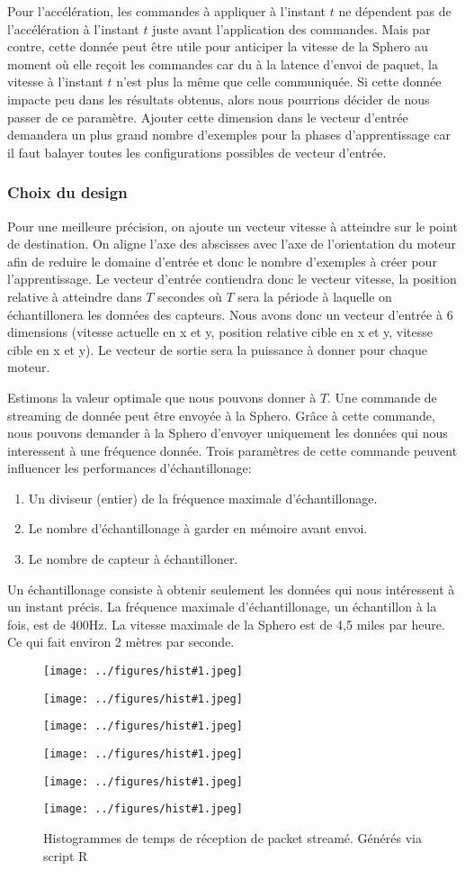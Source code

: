 Pour l'accélération, les commandes à appliquer à l'instant $t$ ne dépendent pas de l'accélération à l'instant $t$ juste avant l'application des commandes.
Mais par contre, cette donnée peut être utile pour anticiper la vitesse de la Sphero au moment où elle reçoit les commandes car du à la latence d'envoi de paquet, la vitesse à l'instant $t$ n'est plus la même que celle communiquée.
Si cette donnée impacte peu dans les résultats obtenus, alors nous pourrions décider de nous passer de ce paramètre.
Ajouter cette dimension dans le vecteur d'entrée demandera un plus grand nombre d'exemples pour la phases d'apprentissage car il faut balayer toutes les configurations possibles de vecteur d'entrée.

\newcommand{\inchist}[1]{
 \begin{minipage}{0.48\textwidth}
  \texttt{[image: ../figures/hist\#1.jpeg]}
 \end{minipage}
}
\subsubsection{Choix du design}\label{sec:choixdesign}
Pour une meilleure précision, on ajoute un vecteur vitesse à atteindre sur le point de destination.
On aligne l'axe des abscisses avec l'axe de l'orientation du moteur afin de reduire le domaine d'entrée et donc le nombre d'exemples à créer pour l'apprentissage.
Le vecteur d'entrée contiendra donc le vecteur vitesse, la position relative à atteindre dans $T$ secondes où $T$ sera la période à laquelle on échantillonera les données des capteurs.
Nous avons donc un vecteur d'entrée à 6 dimensions (vitesse actuelle en x et y, position relative cible en x et y, vitesse cible en x et y).
Le vecteur de sortie sera la puissance à donner pour chaque moteur.

Estimons la valeur optimale que nous pouvons donner à $T$.
Une commande de streaming de donnée peut être envoyée à la Sphero.
Grâce à cette commande, nous pouvons demander à la Sphero d'envoyer uniquement les données qui nous interessent à une fréquence donnée.
Trois paramètres de cette commande peuvent influencer les performances d'échantillonage:
\begin{enumerate}
 \item Un diviseur (entier) de la fréquence maximale d'échantillonage.
 \item Le nombre d'échantillonage à garder en mémoire avant envoi.
 \item Le nombre de capteur à échantilloner.
\end{enumerate}
Un échantillonage consiste à obtenir seulement les données qui nous intéressent à un instant précis.
La fréquence maximale d'échantillonage, un échantillon à la fois, est de 400Hz.\cite{SDKofficiels}
La vitesse maximale de la Sphero est de 4,5 miles par heure.\cite{product} Ce qui fait environ 2 mètres par seconde.
\begin{figure}
 \centering
 \inchist{20}
 \inchist{40}
 \inchist{60}
 \inchist{80}
 \inchist{100}
 \inchist{200}
 \caption{Histogrammes de temps de réception de packet streamé. Générés via script R}
 \label{histogrammes}
\end{figure}

